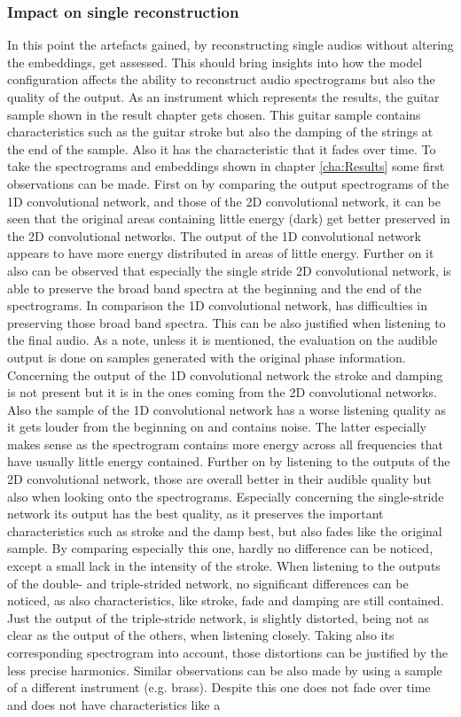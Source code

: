 \subsubsection{Impact on single reconstruction}
In this point the artefacts gained, by reconstructing single audios without altering the embeddings, get assessed. This should bring insights into how the model configuration affects the ability to reconstruct audio spectrograms but also the quality of the output. As an instrument which represents the results, the guitar sample shown in the result chapter gets chosen. This guitar sample contains characteristics such as the guitar stroke but also the damping of the strings at the end of the sample. Also it has the characteristic that it fades over time. To take the spectrograms and embeddings shown in chapter \ref{cha:Results} some first observations can be made. First on by comparing the output spectrograms of the 1D convolutional network, and those of the 2D convolutional network, it can be seen that the original areas containing little energy (dark) get better preserved in the 2D convolutional networks. The output of the 1D convolutional network appears to have more energy distributed in areas of little energy. Further on it also can be observed that especially the single stride 2D convolutional network, is able to preserve the broad band spectra at the beginning and the end of the spectrograms. In comparison the 1D convolutional network, has difficulties in preserving those broad band spectra. This can be also justified when listening to the final audio. As a note, unless it is mentioned, the evaluation on the audible output is done on samples generated with the original phase information. Concerning the output of the 1D convolutional network the stroke and damping is not present but it is in the ones coming from the 2D convolutional networks. Also the sample of the 1D convolutional network has a worse listening quality as it gets louder from the beginning on and contains noise. The latter especially makes sense as the spectrogram contains more energy across all frequencies that have usually little energy contained. Further on by listening to the outputs of the 2D convolutional network, those are overall better in their audible quality but also when looking onto the spectrograms. Especially concerning the single-stride network its output has the best quality, as it preserves the important characteristics such as stroke and the damp best, but also fades like the original sample. By comparing especially this one, hardly no difference can be noticed, except a small lack in the intensity of the stroke. When listening to the outputs of the double- and triple-strided network, no significant differences can be noticed, as also characteristics, like stroke, fade and damping are still contained. Just the output of the triple-stride network, is slightly distorted, being not as clear as the output of the others, when listening closely. Taking also its corresponding spectrogram into account, those distortions can be justified by the less precise harmonics. Similar observations can be also made by using a sample of a different instrument (e.g. brass). Despite this one does not fade over time and does not have characteristics like a 